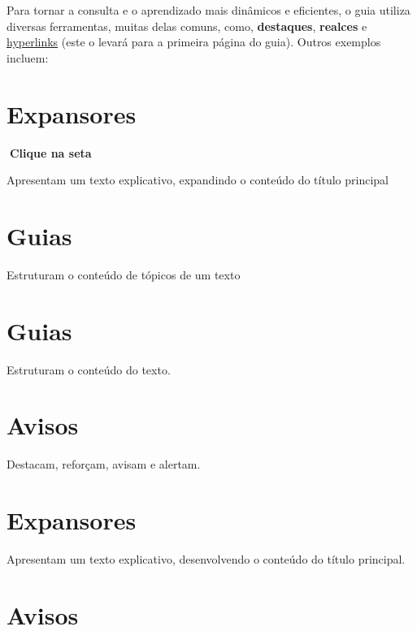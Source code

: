 \documentclass[
  letterpaper,
  DIV=11,
  numbers=noendperiod]{scrreprt}
\begin{document}
Para tornar a consulta e o aprendizado mais dinâmicos e eficientes, o
guia utiliza diversas ferramentas, muitas delas comuns, como,
\textbf{destaques}, {\textbf{realces}} e
\protect\hyperlink{bem-vindo}{hyperlinks} (este o levará para a primeira
página do guia). Outros exemplos incluem:

\hypertarget{expansores}{%
\section{Expansores}\label{expansores}}

\begin{tcolorbox}[enhanced jigsaw, opacityback=0, toprule=.15mm, breakable, leftrule=.75mm, rightrule=.15mm, left=2mm, colback=white, arc=.35mm, bottomrule=.15mm]

\textbf{🔽{Clique na seta}}\vspace{2mm}

Apresentam um texto explicativo, expandindo o conteúdo do título
principal

\end{tcolorbox}

\hypertarget{guias}{%
\section{Guias}\label{guias}}

Estruturam o conteúdo de tópicos de um texto

\section{Guias}

Estruturam o conteúdo do texto.

\section{Avisos}

Destacam, reforçam, avisam e alertam.

\section{Expansores}

Apresentam um texto explicativo, desenvolvendo o conteúdo do título
principal.

\hypertarget{avisos-1}{%
\section{Avisos}\label{avisos-1}}
\end{document}
